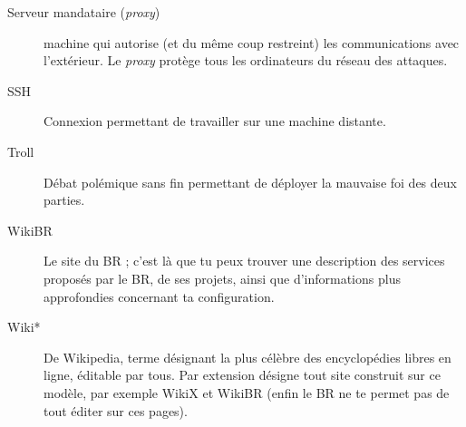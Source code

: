 \begin{description}
    \item[Serveur mandataire (\emph{proxy})] machine qui autorise (et du même coup restreint) les communications avec l'extérieur. Le \emph{proxy} protège tous les ordinateurs du réseau des attaques.
  \item[SSH] Connexion permettant de travailler sur une machine distante.
  \item[Troll] Débat polémique sans fin permettant de déployer la mauvaise foi des deux parties.
  \item[WikiBR] Le site du BR ; c'est là que tu peux trouver une description des services proposés par le BR, de ses projets, ainsi que
  d'informations plus approfondies concernant ta configuration.
  \item[Wiki*] De Wikipedia, terme d\'esignant la plus c\'el\`ebre des encyclop\'edies libres en ligne, \'editable par tous. Par extension d\'esigne tout site construit sur ce mod\`ele, par exemple WikiX et WikiBR (enfin le BR ne te permet pas de tout \'editer sur ces pages).
\end{description}
